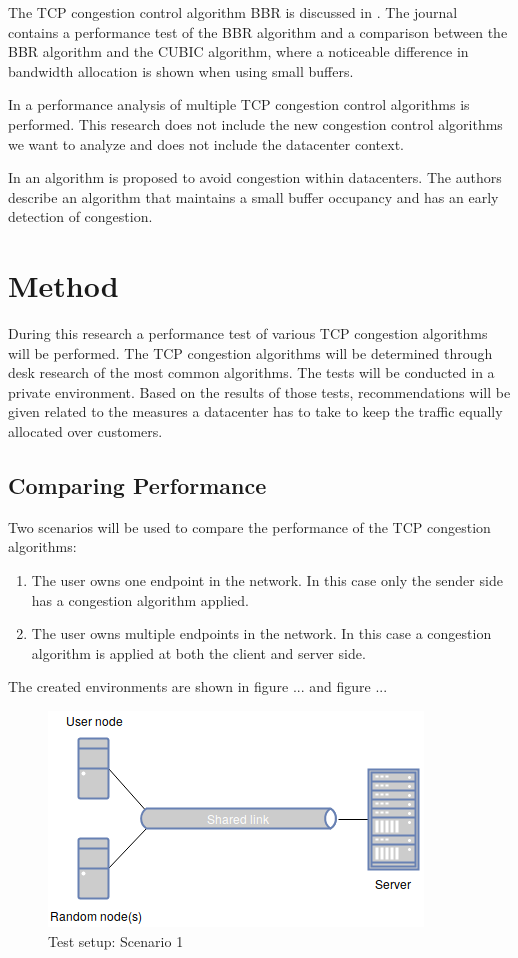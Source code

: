 \documentclass{article}
\begin{document}

The TCP congestion control algorithm BBR is discussed in \cite{bbr-congestion}.
The journal contains a performance test of the BBR algorithm and a comparison
between the BBR algorithm and the CUBIC algorithm, where a noticeable
difference in bandwidth allocation is shown when using small buffers.

In \cite{multiple-congestion} a performance analysis of multiple TCP congestion
control algorithms is performed. This research does not include the new
congestion control algorithms we want to analyze and does not include the
datacenter context.

In \cite{dctcp-congestion-original} an algorithm is proposed to avoid
congestion within datacenters. The authors describe an algorithm that maintains
a small buffer occupancy and has an early detection of congestion.


\section{Method}
During this research a performance test of various TCP congestion algorithms will be performed. The TCP congestion algorithms will be determined through desk research of the most common algorithms. The tests will be conducted in a private environment. Based on the results of those tests, recommendations will be given related to the measures a datacenter has to take to keep the traffic equally allocated over customers. 
	
	\subsection{Comparing Performance}
	Two scenarios will be used to compare the performance of the TCP congestion algorithms:
	\begin{enumerate}
		\item The user owns one endpoint in the network. In this case only the sender side has a congestion algorithm applied.
		\item The user owns multiple endpoints in the network. In this case a congestion algorithm is applied at both the client and server side.
	\end{enumerate}
	
	The created environments are shown in figure ... and figure ...
	\begin{figure}[H] 
		\label{fig:setup1}
		\caption{Test setup: Scenario 1}
		\begin{center}
  			\includegraphics[scale=0.5]{figs/setup1.png}
  		\end{center}
	\end{figure}
	
\end{document}
